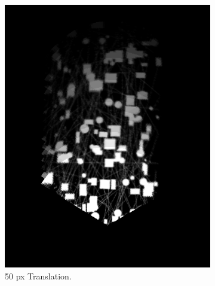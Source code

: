 \begin{figure}[H]
\begin{subfigure}[b]{0.47\textwidth}
        \includegraphics[width=\textwidth]{figures/results/Translation-Surge-Combined/FMT-4.png}
        \caption{50 px Translation.}
        \label{sfig:fmt-surge-4}
    \end{subfigure}
    \hfill
    \begin{subfigure}[b]{0.47\textwidth}
        \centering

\end{subfigure}
\end{figure}
